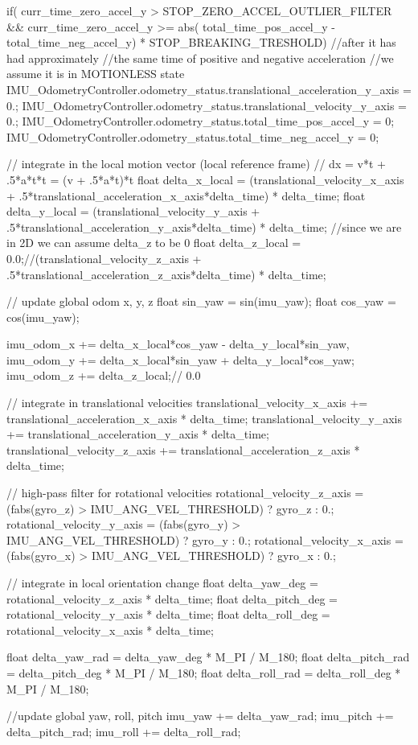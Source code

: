 \begin{ccode}
	if( curr_time_zero_accel_y > STOP_ZERO_ACCEL_OUTLIER_FILTER && curr_time_zero_accel_y >= abs( total_time_pos_accel_y - total_time_neg_accel_y) * STOP_BREAKING_TRESHOLD) {
		//after it has had approximately
			//the same time of positive and negative acceleration
			//we assume it is in MOTIONLESS state
		IMU_OdometryController.odometry_status.translational_acceleration_y_axis = 0.;
		IMU_OdometryController.odometry_status.translational_velocity_y_axis = 0.;
		IMU_OdometryController.odometry_status.total_time_pos_accel_y = 0;
		IMU_OdometryController.odometry_status.total_time_neg_accel_y = 0;
	}
	
	// integrate in the local motion vector (local reference frame)
	// dx = v*t + .5*a*t*t = (v + .5*a*t)*t
	float delta_x_local = (translational_velocity_x_axis + .5*translational_acceleration_x_axis*delta_time) * delta_time;
	float delta_y_local = (translational_velocity_y_axis + .5*translational_acceleration_y_axis*delta_time) * delta_time;
		//since we are in 2D we can assume delta_z to be 0
	float delta_z_local = 0.0;//(translational_velocity_z_axis + .5*translational_acceleration_z_axis*delta_time) * delta_time;
	
	// update global odom x, y, z
	float sin_yaw = sin(imu_yaw);
	float cos_yaw = cos(imu_yaw);
	
	imu_odom_x += delta_x_local*cos_yaw - delta_y_local*sin_yaw,
	imu_odom_y += delta_x_local*sin_yaw + delta_y_local*cos_yaw;
	imu_odom_z += delta_z_local;// 0.0
	
	// integrate in translational velocities
	translational_velocity_x_axis += translational_acceleration_x_axis * delta_time;
	translational_velocity_y_axis += translational_acceleration_y_axis * delta_time;
	translational_velocity_z_axis += translational_acceleration_z_axis * delta_time;
	
	// high-pass filter for rotational velocities
	rotational_velocity_z_axis = (fabs(gyro_z) > IMU_ANG_VEL_THRESHOLD) ? gyro_z : 0.;
	rotational_velocity_y_axis = (fabs(gyro_y) > IMU_ANG_VEL_THRESHOLD) ? gyro_y : 0.;
	rotational_velocity_x_axis = (fabs(gyro_x) > IMU_ANG_VEL_THRESHOLD) ? gyro_x : 0.;
	
	// integrate in local orientation change
	float delta_yaw_deg = rotational_velocity_z_axis * delta_time;
	float delta_pitch_deg = rotational_velocity_y_axis * delta_time;
	float delta_roll_deg =	rotational_velocity_x_axis * delta_time;
	
	float delta_yaw_rad = delta_yaw_deg * M_PI / M_180;
	float delta_pitch_rad = delta_pitch_deg * M_PI / M_180;
	float delta_roll_rad = delta_roll_deg * M_PI / M_180;
	
	//update global yaw, roll, pitch
	imu_yaw += delta_yaw_rad;
 	imu_pitch += delta_pitch_rad;
 	imu_roll += delta_roll_rad;
\end{ccode}
